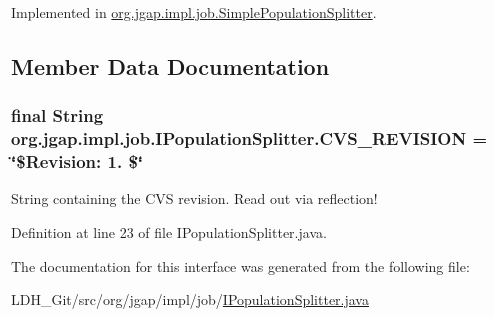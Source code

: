 Implemented in \hyperlink{classorg_1_1jgap_1_1impl_1_1job_1_1_simple_population_splitter_aa8509aed8251aeddab03242c7cbf848f}{org.\-jgap.\-impl.\-job.\-Simple\-Population\-Splitter}.



\subsection{Member Data Documentation}
\hypertarget{interfaceorg_1_1jgap_1_1impl_1_1job_1_1_i_population_splitter_ad8f8dafa3a3e1ef076e7c3e2efa05f93}{
\subsubsection[{C\-V\-S\-\_\-\-R\-E\-V\-I\-S\-I\-O\-N}]{\setlength{\rightskip}{0pt plus 5cm}final String org.\-jgap.\-impl.\-job.\-I\-Population\-Splitter.\-C\-V\-S\-\_\-\-R\-E\-V\-I\-S\-I\-O\-N = \char`\"{}\$Revision\-: 1. \$\char`\"{}\hspace{0.3cm}{\ttfamily [static]}}}\label{interfaceorg_1_1jgap_1_1impl_1_1job_1_1_i_population_splitter_ad8f8dafa3a3e1ef076e7c3e2efa05f93}
String containing the C\-V\-S revision. Read out via reflection! 

Definition at line 23 of file I\-Population\-Splitter.\-java.



The documentation for this interface was generated from the following file\-:\begin{DoxyCompactItemize}
\item 
L\-D\-H\-\_\-\-Git/src/org/jgap/impl/job/\hyperlink{_i_population_splitter_8java}{I\-Population\-Splitter.\-java}\end{DoxyCompactItemize}

